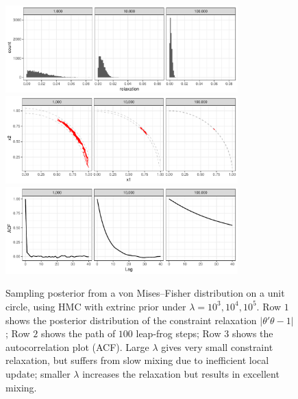 \documentclass[10pt]{article}
\begin{document}
\begin{figure}[H]
 \centering
    \includegraphics[width=0.8\textwidth]{unit_circle_violation}
  \includegraphics[width=0.8\textwidth]{unit_circle_100steps}
 \includegraphics[width=0.8\textwidth]{unit_circle_acf}
\caption{Sampling posterior from a von Mises--Fisher distribution on a unit circle, using HMC with extrinc prior under $\lambda=10^3,10^4,10^5$. Row $1$ shows the posterior distribution of the constraint relaxation $|\theta'\theta -1|$; Row $2$ shows the path of $100$ leap-frog steps; Row $3$ shows the autocorrelation plot (ACF). Large $\lambda$ gives very small constraint relaxation, but suffers from slow mixing due to inefficient local update; smaller $\lambda$ increases the relaxation but results in excellent mixing.}
\label{unit_circle}
\end{figure}
\end{document}
